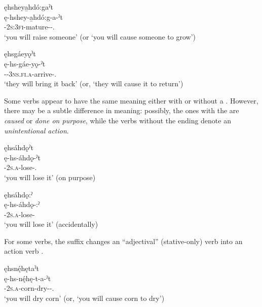 \ex ęhsheya̱hdó:gaˀt\\
\gll ę-hshey-a̱hdó:g-a-ˀt\\
\fut-\textsc{2s:3fi}-mature-{\joinerA}-{\causative}.{\zeropunctual}\\
\glt ‘you will raise someone’  (or ‘you will cause someone to grow’)


\ex ęhsgáeyǫˀt\\
\gll ę-hs-gáe-yǫ-ˀt\\
\fut-{\repetitive}-\textsc{3ns.fi.a}-arrive-{\causative}.{\zeropunctual}\\
\glt ‘they will bring it back’ (or, ‘they will cause it to return’)

\z
\z

Some verbs appear to have the same meaning either with or without a \linebreak {} {\causative} . However, there may be a subtle difference in meaning: possibly, the ones with the  {\causative} are \emph{caused} or \emph{done on purpose}, while the verbs without the ending denote an \emph{unintentional action}.

\ea\label{ex:causex5}
\ea ęhsáhdǫˀt \\
\gll ę-hs-áhdǫ-ˀt\\
\fut-\textsc{2s.a}-lose-{\causative}.{\zeropunctual}\\
\glt ‘you will lose it’ (on purpose)

\ex ęhsáhdǫ:ˀ \\
\gll ę-hs-áhdǫ-:ˀ\\
\fut-\textsc{2s.a}-lose-{\punctual}\\
\glt ‘you will lose it’ (accidentally)
\z
\z

For some verbs, the  {\causative} suffix changes an “adjectival” (stative-only) verb into an action verb .

\ea\label{ex:causex6}
\ea ęhsnę́hętaˀt \\
\gll ę-hs-nę́hę-t-a-ˀt\\
{\future}-\textsc{2s.a}-corn-dry-{\joinerA}-{\causative}.{\zeropunctual}\\
\glt ‘you will dry corn’ (or, ‘you will cause corn to dry’)

